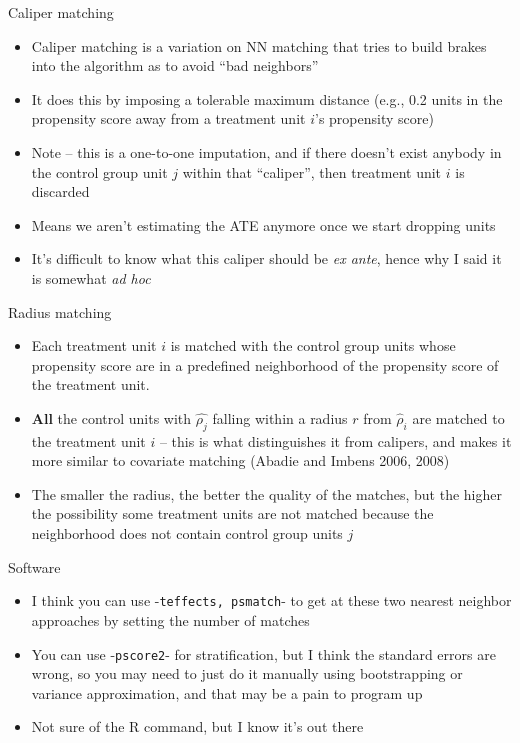 \documentclass{beamer}
\begin{document}
\begin{frame}{Caliper matching}
	
	\begin{itemize}
	\item Caliper matching is a variation on NN matching that tries to build brakes into the algorithm as to avoid ``bad neighbors''
	\item It does this by imposing a tolerable maximum distance (e.g., 0.2 units in the propensity score away from a treatment unit $i$'s propensity score)
	\item Note -- this is a one-to-one imputation, and if there doesn't exist anybody in the control group unit $j$ within that ``caliper'', then treatment unit $i$ is discarded
	\item Means we aren't estimating the ATE anymore once we start dropping units
	\item It's difficult to know what this caliper should be \emph{ex ante}, hence why I said it is somewhat \emph{ad hoc}
	\end{itemize}

\end{frame}


\begin{frame}{Radius matching}
	
	
		\begin{itemize}
		\item Each treatment unit $i$ is matched with the control group units whose propensity score are in a predefined neighborhood of the propensity score of the treatment unit.
		\item \textbf{All} the control units with $\widehat{\rho_j}$ falling within a radius $r$ from $\widehat{\rho}_i$ are matched to the treatment unit $i$ -- this is what distinguishes it from calipers, and makes it more similar to covariate matching (Abadie and Imbens 2006, 2008)
		\item The smaller the radius, the better the quality of the matches, but the higher the possibility some treatment units are not matched because the neighborhood does not contain control group units $j$
		\end{itemize}
		
\end{frame}

\begin{frame}{Software}

\begin{itemize}
\item I think you can use -\texttt{teffects, psmatch}- to get at these two nearest neighbor approaches by setting the number of matches
\item You can use -\texttt{pscore2}- for stratification, but I think the standard errors are wrong, so you may need to just do it manually using bootstrapping or variance approximation, and that may be a pain to program up
\item Not sure of the R command, but I know it's out there
\end{itemize}

\end{frame}
\end{document}
